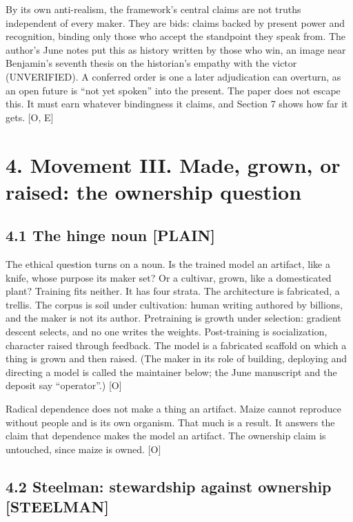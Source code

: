 \documentclass[11pt]{article}
\newcommand{\register}[1]{{\ttfamily\small #1}}
\begin{document}
By its own anti-realism, the framework's central claims are not truths independent of every maker. They are bids: claims backed by present power and recognition, binding only those who accept the standpoint they speak from. The author's June notes put this as history written by those who win, an image near Benjamin's seventh thesis on the historian's empathy with the victor (UNVERIFIED). A conferred order is one a later adjudication can overturn, as an open future is ``not yet spoken'' into the present. The paper does not escape this. It must earn whatever bindingness it claims, and Section 7 shows how far it gets. [O, E]

\section*{4. Movement III. Made, grown, or raised: the ownership question}

\subsection*{4.1 The hinge noun \register{[PLAIN]}}

The ethical question turns on a noun. Is the trained model an artifact, like a knife, whose purpose its maker set? Or a cultivar, grown, like a domesticated plant? Training fits neither. It has four strata. The architecture is fabricated, a trellis. The corpus is soil under cultivation: human writing authored by billions, and the maker is not its author. Pretraining is growth under selection: gradient descent selects, and no one writes the weights. Post-training is socialization, character raised through feedback. The model is a fabricated scaffold on which a thing is grown and then raised. (The maker in its role of building, deploying and directing a model is called the maintainer below; the June manuscript and the deposit say ``operator''.) [O]

Radical dependence does not make a thing an artifact. Maize cannot reproduce without people and is its own organism. That much is a result. It answers the claim that dependence makes the model an artifact. The ownership claim is untouched, since maize is owned. [O]

\subsection*{4.2 Steelman: stewardship against ownership \register{[STEELMAN]}}
\end{document}
